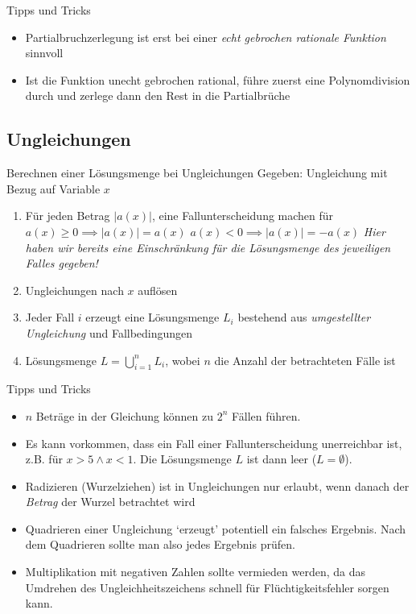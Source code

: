 \documentclass[german]{spicker}
\begin{document}
\begin{bonus}{Tipps und Tricks}
    \begin{itemize}
        \item Partialbruchzerlegung ist erst bei einer \emph{echt gebrochen rationale Funktion} sinnvoll
        \item Ist die Funktion unecht gebrochen rational, führe zuerst eine Polynomdivision durch und zerlege dann den Rest in die Partialbrüche
    \end{itemize}
\end{bonus}

\subsection{Ungleichungen}

\begin{algo}{Berechnen einer Lösungsmenge bei Ungleichungen}
    Gegeben: Ungleichung mit Bezug auf Variable $x$
    \begin{enumerate}
        \item Für jeden Betrag $\left| a(x) \right|$, eine Fallunterscheidung machen für
              \subitem $a(x) \geq 0 \implies \left| a(x) \right| = a(x)$
              \subitem $a(x) < 0 \implies \left| a(x) \right| = -a(x)$
              \subitem \emph{Hier haben wir bereits eine Einschränkung für die Lösungsmenge des jeweiligen Falles gegeben!}
        \item Ungleichungen nach $x$ auflösen
        \item Jeder Fall $i$ erzeugt eine Lösungsmenge $L_i$ bestehend aus\emph{ umgestellter Ungleichung} und Fallbedingungen
        \item Lösungsmenge $L = \bigcup^n_{i = 1} L_i$, wobei $n$ die Anzahl der betrachteten Fälle ist
    \end{enumerate}
\end{algo}

\begin{bonus}{Tipps und Tricks}
    \begin{itemize}
        \item $n$ Beträge in der Gleichung können zu $2^n$ Fällen führen.
        \item Es kann vorkommen, dass ein Fall einer Fallunterscheidung unerreichbar ist, z.B. für $x > 5 \land x < 1$. Die Lösungsmenge $L$ ist dann leer ($L = \emptyset$).
        \item Radizieren (Wurzelziehen) ist in Ungleichungen nur erlaubt, wenn danach der \emph{Betrag} der Wurzel betrachtet wird
        \item Quadrieren einer Ungleichung `erzeugt' potentiell ein falsches Ergebnis. Nach dem Quadrieren sollte man also jedes Ergebnis prüfen.
        \item Multiplikation mit negativen Zahlen sollte vermieden werden, da das Umdrehen des Ungleichheitszeichens schnell für Flüchtigkeitsfehler sorgen kann.
    \end{itemize}
\end{bonus}
\end{document}
